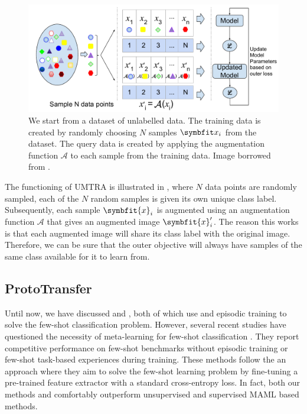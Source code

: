 \begin{figure}[ht]
    \centering
    \includegraphics[width=\linewidth]{chapters/assets/fsl/UnsupervisedMetaTraining3.pdf}
    \caption{We start from a dataset of unlabelled data. The training data is created by randomly choosing $N$ samples $\bfitx_i$ from the dataset. The query data is created by applying the augmentation function $\mathcal{A}$ to each sample from the training data. Image borrowed from \parencite{Khodadadeh2018UnsupervisedClassification}.}
    \label{fig:umtra}
\end{figure}

The functioning of UMTRA is illustrated in , where $N$ data points are randomly sampled, each of the $N$ random samples is given its own unique class label. Subsequently, each sample $\symbfit{x}_i$ is augmented using an augmentation function $\mathcal{A}$ that gives an augmented image $\symbfit{x}_i^\prime$. 
The reason this works is that each augmented image will share its class label with the original image. Therefore, we can be sure that the outer objective will always have samples of the same class available for it to learn from. 

\subsection{ProtoTransfer}\label{ssec:prototransfer}

Until now, we have discussed  and , both of which use  and episodic training to solve the few-shot classification problem.
However, several recent studies have questioned the necessity of meta-learning for few-shot classification \parencite{goodemballneed2020, Medina2020Self-SupervisedClassification, dhillon2019baseline, ziko2020laplacian, boudiaf2020information,chen2021self}.
They report competitive performance on few-shot benchmarks without episodic training or few-shot task-based experiences during training. These methods follow the an approach where they aim to solve the few-shot learning problem by fine-tuning a pre-trained feature extractor with a standard cross-entropy loss. In fact, both our methods \ccclr{} and \samptr{} comfortably outperform unsupervised and supervised MAML based methods.

